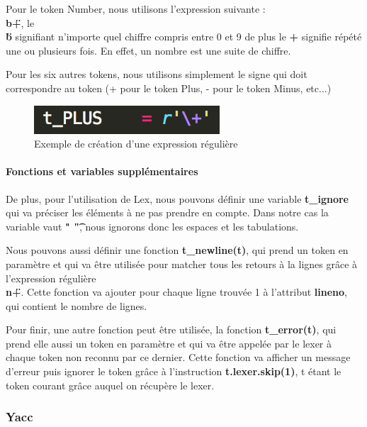\documentclass[a4paper,12pt]{article}
\begin{document}
				Pour le token Number, nous utilisons l'expression suivante : \textbf{\"\\b+\"}, le \textbf{\"\\b\"} signifiant n'importe quel chiffre compris entre 0 et 9 de plus le \textbf{+} signifie répété une ou plusieurs fois. En effet, un nombre est une suite de chiffre.

				Pour les six autres tokens, nous utilisons simplement le signe qui doit correspondre au token (+ pour le token Plus, - pour le token Minus, etc...)
			
				\begin{figure}[h!]
					\begin{center}
						\includegraphics[scale=1]{images/exp_regex}
						\caption{Exemple de création d'une expression régulière}
					\end{center}
				\end{figure}


			\paragraph{Fonctions et variables supplémentaires\\}

				De plus, pour l'utilisation de Lex, nous pouvons définir une variable \textbf{t\_ignore} qui va préciser les éléments à ne pas prendre en compte. Dans notre cas la variable vaut \textbf{" \t"}, nous ignorons donc les espaces et les tabulations.

				Nous pouvons aussi définir une fonction \textbf{t\_newline(t)}, qui prend un token en paramètre et qui va être utilisée pour matcher tous les retours à la lignes grâce à l'expression régulière \textbf{\"\\n+\"}. Cette fonction va ajouter pour chaque ligne trouvée 1 à l'attribut \textbf{lineno}, qui contient le nombre de lignes.

				Pour finir, une autre fonction peut être utilisée, la fonction \textbf{t\_error(t)}, qui prend elle aussi un token en paramètre et qui va être appelée par le lexer à chaque token non reconnu par ce dernier. Cette fonction va afficher un message d'erreur puis ignorer le token grâce à l'instruction \textbf{t.lexer.skip(1)}, t étant le token courant grâce auquel on récupère le lexer. 

		\subsubsection{Yacc}
\end{document}
